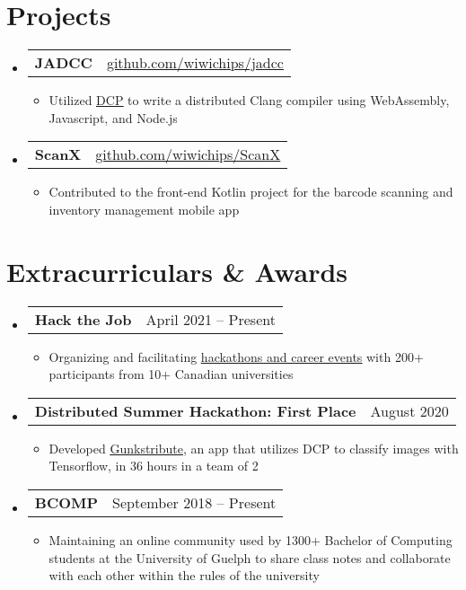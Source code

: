 \documentclass[letterpaper,11pt]{article}
\makeatletter
\newcommand{\resumeItem}[1]{
  \item\small{
    {#1 \vspace{-2pt}}
  }
}
\newcommand{\resumeProjectHeading}[2]{
    \item
    \begin{tabular*}{0.97\textwidth}{l@{\extracolsep{\fill}}r}
      \small#1 & #2 \\
    \end{tabular*}\vspace{-7pt}
}
\newcommand{\resumeSubHeadingListStart}{\begin{itemize}[leftmargin=0.15in, label={}]}
\newcommand{\resumeSubHeadingListEnd}{\end{itemize}}
\newcommand{\resumeItemListStart}{\begin{itemize}}
\newcommand{\resumeItemListEnd}{\end{itemize}\vspace{-5pt}}
\makeatother
\begin{document}
\section{Projects}
  \resumeSubHeadingListStart
    \resumeProjectHeading
      {\textbf{JADCC}}{\href{https://github.com/wiwichips/jadcc}{\underline{github.com/wiwichips/jadcc}}}
      \resumeItemListStart
        \resumeItem{Utilized \href{https://dcp.dev/}{\underline{DCP}} to write a distributed Clang compiler using WebAssembly, Javascript, and Node.js }
      \resumeItemListEnd
        
    \resumeProjectHeading
      {\textbf{ScanX}}{\href{https://github.com/wiwichips/ScanX}{\underline{github.com/wiwichips/ScanX}}}
      \resumeItemListStart
        \resumeItem{Contributed to the front-end Kotlin project for the barcode scanning and inventory management mobile app}
      \resumeItemListEnd
  \resumeSubHeadingListEnd


\section{Extracurriculars \& Awards}
  \resumeSubHeadingListStart
    \resumeProjectHeading
      {\textbf{Hack the Job}}{April 2021 -- Present}
      \resumeItemListStart
        \resumeItem{Organizing and facilitating \href{https://hackthejob.ca}{\underline{hackathons and career events}} with 200+ participants from 10+ Canadian universities}
      \resumeItemListEnd
        
    \resumeProjectHeading
      {\textbf{Distributed Summer Hackathon: First Place}}{August 2020}
      \resumeItemListStart
        \resumeItem{Developed \href{https://github.com/wiwichips/gcb}{\underline{Gunkstribute}}, an app that utilizes DCP to classify images with Tensorflow, in 36 hours in a team of 2}
      \resumeItemListEnd
    
    \resumeProjectHeading
      {\textbf{BCOMP}}{September 2018 -- Present}
      \resumeItemListStart
        \resumeItem{Maintaining an online community used by 1300+ Bachelor of Computing students at the University of Guelph to share class notes and collaborate with each other within the rules of the university}
      \resumeItemListEnd
  \resumeSubHeadingListEnd

\end{document}
